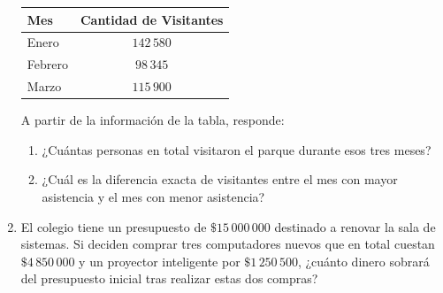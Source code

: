 \documentclass[12pt, letterpaper]{article}
\newif\ifmostrarrespuestas
\newcommand{\respuesta}[1]{%
	\ifmostrarrespuestas
	\par\vspace{0.2cm}%
	\begin{tcolorbox}[
		enhanced,
		colback=valred!5,         %
		colframe=valred,          %
		arc=2mm,                  %
		boxrule=1pt,              %
		title={\small\bfseries\ding{51} Solución / Procedimiento},
		coltitle=white,           %
		boxed title style={colback=valred, arc=1mm}, %
		top=3mm, bottom=3mm, left=3mm, right=3mm %
		]
		#1
	\end{tcolorbox}%
	\par\vspace{0.1cm}%
	\fi
}
\begin{document}
\begin{enumerate}[itemsep=0.8cm]
		\begin{table}[h]
			\centering
			\begin{tabular}{lc}
				\toprule
				\textbf{Mes} & \textbf{Cantidad de Visitantes} \\
				\midrule
				Enero & $142\,580$ \\
				Febrero & $98\,345$ \\
				Marzo & $115\,900$ \\
				\bottomrule
			\end{tabular}
		\end{table}
		
		A partir de la información de la tabla, responde:
		\begin{enumerate}[label=\alph*., itemsep=0.2cm, topsep=0.2cm]
			\item ¿Cuántas personas en total visitaron el parque durante esos tres meses?
			\item ¿Cuál es la diferencia exacta de visitantes entre el mes con mayor asistencia y el mes con menor asistencia?
		\end{enumerate}
		\respuesta{
		\begin{enumerate}
			\item 356825
			\item 26680 
		
		\end{enumerate}
		}
		\item El colegio tiene un presupuesto de $\$15\,000\,000$ destinado a renovar la sala de sistemas. Si deciden comprar tres computadores nuevos que en total cuestan $\$4\,850\,000$ y un proyector inteligente por $\$1\,250\,500$, ¿cuánto dinero sobrará del presupuesto inicial tras realizar estas dos compras?
		
		\respuesta{
		Sobra: $8\,899\,500$
		}
		
	\end{enumerate}
	
	\newpage
	
\end{document}
